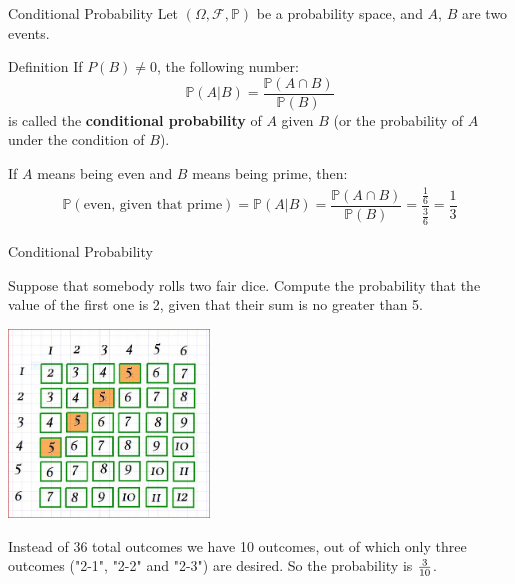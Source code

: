 \documentclass{beamer}
\newcommand{\PP}{\mathbb{P}}
\newcommand{\F}{\mathcal{F}}
\begin{document}
\begin{frame}{Conditional Probability}
Let \( (\Omega, \F, \PP) \) be a probability space, and $A$, $B$ are two events.
   \begin{block}{Definition}
      If \( P(B) \neq 0 \), the following number:
\[ \PP(A|B) = \frac{\PP(A \cap B)}{\PP(B)} \]
is called the\textbf{ conditional probability} of \( A \) given \( B \) (or the probability of \( A \) under the condition of \( B \)).
   \end{block}
    \pause
    \begin{example}
        If $A$ means being even and $B$ means being prime, then:
        \begin{align*}
            \PP(\text{even, given that prime})=\PP(A|B)=\dfrac{\PP(A\cap B)}{\PP(B)}=\dfrac{\frac{1}{6}}{\frac{3}{6}}=\dfrac{1}{3}
        \end{align*}
    \end{example}
\end{frame}

\begin{frame}{Conditional Probability}

    \begin{example}
Suppose that somebody rolls two fair dice. Compute the probability that
the value of the first one is 2, given that their sum is no
greater than 5.\pause
\vspace{0.2em}
      \begin{center}

    \includegraphics[width=0.4\textwidth, height=\textheight, keepaspectratio]{dice.jpg}
  \end{center}
    Instead of 36 total outcomes we have 10 outcomes, out of which only three outcomes ("2-1", "2-2" and "2-3") are desired. So the probability is $3\over10$.
    \end{example}
\end{frame}
\end{document}
